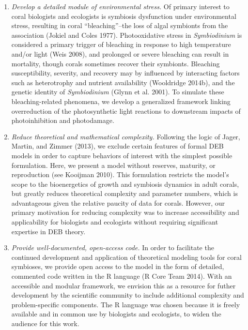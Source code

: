 \documentclass[]{elsarticle} %
\begin{document}
\begin{enumerate}
\def\labelenumi{\arabic{enumi}.}
\item
  \emph{Develop a detailed module of environmental stress.} Of primary
  interest to coral biologists and ecologists is symbiosis dysfunction
  under environmental stress, resulting in coral ``bleaching''--the loss
  of algal symbionts from the association (Jokiel and Coles 1977).
  Photooxidative stress in \emph{Symbiodinium} is considered a primary
  trigger of bleaching in response to high temperature and/or light
  (Weis 2008), and prolonged or severe bleaching can result in
  mortality, though corals sometimes recover their symbionts. Bleaching
  susceptibility, severity, and recovery may by influenced by
  interacting factors such as heterotrophy and nutrient availability
  (Wooldridge 2014b), and the genetic identity of \emph{Symbiodinium}
  (Glynn et al. 2001). To simulate these bleaching-related phenomena, we
  develop a generalized framework linking overreduction of the
  photosynthetic light reactions to downstream impacts of
  photoinhibition and photodamage.
\item
  \emph{Reduce theoretical and mathematical complexity.} Following the
  logic of Jager, Martin, and Zimmer (2013), we exclude certain features
  of formal DEB models in order to capture behaviors of interest with
  the simplest possible formulation. Here, we present a model without
  reserves, maturity, or reproduction (see Kooijman 2010). This
  formulation restricts the model's scope to the bioenergetics of growth
  and symbiosis dynamics in adult corals, but greatly reduces
  theoretical complexity and parameter numbers, which is advantageous
  given the relative paucity of data for corals. However, our primary
  motivation for reducing complexity was to increase accessibility and
  applicability for biologists and ecologists without requiring
  significant expertise in DEB theory.
\item
  \emph{Provide well-documented, open-access code.} In order to
  facilitate the continued development and application of theoretical
  modeling tools for coral symbioses, we provide open access to the
  model in the form of detailed, commented code written in the R
  language (R Core Team 2014). With an accessible and modular framework,
  we envision this as a resource for futher development by the
  scientific community to include additional complexity and
  problem-specific components. The R language was chosen because it is
  freely available and in common use by biologists and ecologists, to
  widen the audience for this work.
\end{enumerate}
\end{document}
